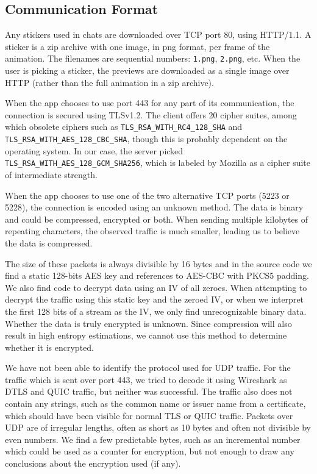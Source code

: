 \documentclass[conference]{IEEEtran}
\begin{document}
\subsection{Communication Format}

Any stickers used in chats are downloaded over TCP port 80, using HTTP/1.1. A
sticker is a zip archive with one image, in png format, per frame of the
animation. The filenames are sequential numbers: \texttt{1.png}, \texttt{2.png},
etc. When the user is picking a sticker, the previews are downloaded as a single
image over HTTP (rather than the full animation in a zip archive).

When the app chooses to use port 443 for any part of its communication, the
connection is secured using TLSv1.2. The client offers 20 cipher suites, among
which obsolete ciphers such as \texttt{TLS\_RSA\_WITH\_RC4\_128\_SHA} and
\texttt{TLS\_RSA\_WITH\_AES\_128\_CBC\_SHA}, though this is probably dependent
on the operating system. In our case, the server picked
\texttt{TLS\_RSA\_WITH\_AES\_128\_GCM\_SHA256}, which is labeled by Mozilla as a
cipher suite of intermediate strength\cite{moz-tls}.

When the app chooses to use one of the two alternative TCP ports (5223 or
5228), the connection is encoded using an unknown method. The data is binary
and could be compressed, encrypted or both. When sending multiple kilobytes of
repeating characters, the observed traffic is much smaller, leading us to
believe the data is compressed.

The size of these packets is always divisible by 16 bytes and in the source
code we find a static 128-bits AES key and references to AES-CBC with PKCS5
padding. We also find code to decrypt data using an IV of all zeroes. When
attempting to decrypt the traffic using this static key and the zeroed IV, or
when we interpret the first 128 bits of a stream as the IV, we only find
unrecognizable binary data. Whether the data is truly encrypted is unknown.
Since compression will also result in high entropy estimations, we cannot use
this method to determine whether it is encrypted.

We have not been able to identify the protocol used for UDP traffic. For the
traffic which is sent over port 443, we tried to decode it using Wireshark as
DTLS and QUIC traffic, but neither was successful. The traffic also does not
contain any strings, such as the common name or issuer name from a certificate,
which should have been visible for normal TLS or QUIC traffic. Packets over UDP
are of irregular lengths, often as short as 10 bytes and often not divisible by
even numbers. We find a few predictable bytes, such as an incremental number
which could be used as a counter for encryption, but not enough to draw any
conclusions about the encryption used (if any).
\end{document}
